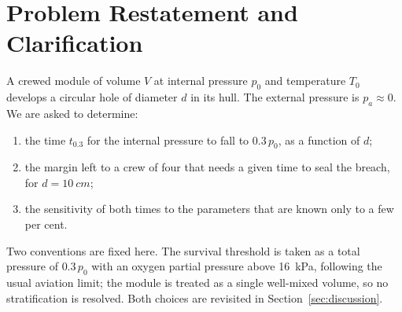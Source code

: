 \section{Problem Restatement and Clarification}
\label{sec:problem}

A crewed module of volume $V$ at internal pressure $p_0$ and temperature
$T_0$ develops a circular hole of diameter $d$ in its hull. The external
pressure is $p_a\approx 0$. We are asked to determine:

\begin{enumerate}[label=\textbf{Q\arabic*.},leftmargin=*]
  \item the time $t_{0.3}$ for the internal pressure to fall to
        $0.3\,p_0$, as a function of $d$;
  \item the margin left to a crew of four that needs a given time to
        seal the breach, for $d=\SI{10}{cm}$;
  \item the sensitivity of both times to the parameters that are known
        only to a few per cent.
\end{enumerate}

Two conventions are fixed here. The survival threshold is taken as a total
pressure of $0.3\,p_0$ with an oxygen partial pressure above
\SI{16}{kPa}, following the usual aviation limit; the module is treated as
a single well-mixed volume, so no stratification is resolved. Both choices
are revisited in Section~\ref{sec:discussion}.
